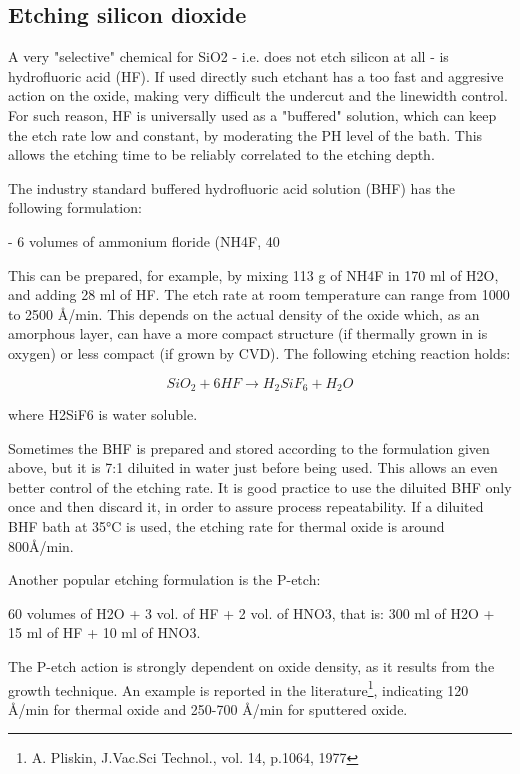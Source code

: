 \subsection{Etching silicon dioxide}
A very "selective" chemical for SiO2 - i.e. does not etch silicon at all - is hydrofluoric acid (HF). If used directly such etchant has a too fast and aggresive action on the oxide, making very difficult the undercut and the linewidth control. For such reason, HF is universally used as a "buffered" solution, which can keep the etch rate low and constant, by moderating the PH level of the bath. This allows the etching time to be reliably correlated to the etching depth.

The industry standard buffered hydrofluoric acid solution (BHF) has the following formulation:

- 6 volumes of ammonium floride (NH4F, 40%

This can be prepared, for example, by mixing 113 g of NH4F in 170 ml of H2O, and adding 28 ml of HF. The etch rate at room temperature can range from 1000 to 2500 Å/min. This depends on the actual density of the oxide which, as an amorphous layer, can have a more compact structure (if thermally grown in is oxygen) or less compact (if grown by CVD). The following etching reaction holds:

\begin{equation}
SiO_2 + 6HF \rightarrow H_2SiF_6 + H_2O
\end{equation}

where H2SiF6 is water soluble.

Sometimes the BHF is prepared and stored according to the formulation given above, but it is 7:1 diluited in water just before being used. This allows an even better control of the etching rate. It is good practice to use the diluited BHF only once and then discard it, in order to assure process repeatability. If a diluited BHF bath at 35°C is used, the etching rate for thermal oxide is around 800Å/min.

Another popular etching formulation is the P-etch:

60 volumes of H2O + 3 vol. of HF + 2 vol. of HNO3, that is: 300 ml of H2O + 15 ml of HF + 10 ml of HNO3.

The P-etch action is strongly dependent on oxide density, as it results from the growth technique. An example is reported in the literature\footnote{A. Pliskin, J.Vac.Sci Technol., vol. 14, p.1064, 1977}, indicating 120 Å/min for thermal oxide and 250-700 Å/min for sputtered oxide.

